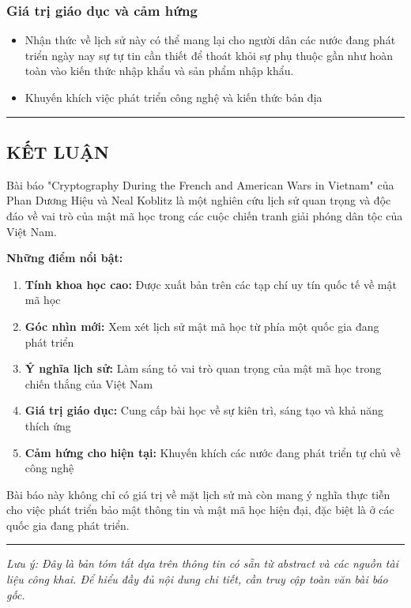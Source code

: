 \subsubsection{Giá trị giáo dục và cảm hứng}
\begin{itemize}
\item Nhận thức về lịch sử này có thể mang lại cho người dân các nước đang phát triển ngày nay sự tự tin cần thiết để thoát khỏi sự phụ thuộc gần như hoàn toàn vào kiến thức nhập khẩu và sản phẩm nhập khẩu.
\item Khuyến khích việc phát triển công nghệ và kiến thức bản địa
\end{itemize}

\vspace{0.5cm}
\rule{\textwidth}{1pt}
\vspace{0.5cm}

\subsection{KẾT LUẬN}

Bài báo "Cryptography During the French and American Wars in Vietnam" của Phan Dương Hiệu và Neal Koblitz là một nghiên cứu lịch sử quan trọng và độc đáo về vai trò của mật mã học trong các cuộc chiến tranh giải phóng dân tộc của Việt Nam.

\textbf{Những điểm nổi bật:}

\begin{enumerate}
\item \textbf{Tính khoa học cao:} Được xuất bản trên các tạp chí uy tín quốc tế về mật mã học
\item \textbf{Góc nhìn mới:} Xem xét lịch sử mật mã học từ phía một quốc gia đang phát triển
\item \textbf{Ý nghĩa lịch sử:} Làm sáng tỏ vai trò quan trọng của mật mã học trong chiến thắng của Việt Nam
\item \textbf{Giá trị giáo dục:} Cung cấp bài học về sự kiên trì, sáng tạo và khả năng thích ứng
\item \textbf{Cảm hứng cho hiện tại:} Khuyến khích các nước đang phát triển tự chủ về công nghệ
\end{enumerate}

Bài báo này không chỉ có giá trị về mặt lịch sử mà còn mang ý nghĩa thực tiễn cho việc phát triển bảo mật thông tin và mật mã học hiện đại, đặc biệt là ở các quốc gia đang phát triển.

\vspace{1cm}
\rule{\textwidth}{1pt}
\vspace{0.5cm}

\begin{center}
\textit{Lưu ý: Đây là bản tóm tắt dựa trên thông tin có sẵn từ abstract và các nguồn tài liệu công khai. Để hiểu đầy đủ nội dung chi tiết, cần truy cập toàn văn bài báo gốc.}
\end{center}